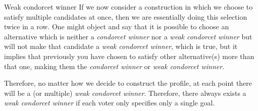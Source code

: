 \documentclass[12pt]{article}
\newenvironment{answer}[2][Answer]{\begin{trivlist}
\item[\hskip \labelsep {\bfseries #1}\hskip \labelsep {\bfseries #2:}]}{\end{trivlist}}
\begin{document}
\begin{answer}{a)}{Weak condorcet winner}
If we now consider a construction in which we choose to satisfy multiple candidates at once, then we are essentially doing this selection twice in a row. One might object and say that it is possible to choose an alternative which is neither a \textit{condorcet winner} nor a \textit{weak condorcet winner} but will not make that candidate a \textit{weak condorcet winner}, which is true, but it implies that previously you have chosen to satisfy other alternative(s) more than that one, making them the \textit{condorcet winner} or \textit{weak condorcet winner}.

Therefore, no matter how we decide to construct the profile, at each point there will be a (or multiple) \textit{weak condorcet winner}. Therefore, there always exists a \textit{weak condorcet winner} if each voter only specifies only a single goal.
\end{answer}
\end{document}
